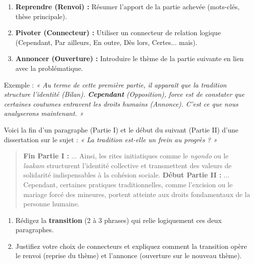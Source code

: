 \documentclass[11pt]{article}
\newcommand{\cle}[1]{{\popxbold\color{popdark}#1}}
\newcounter{popsec}
\newcounter{popsub}
\newcommand{\courssub}[1]{%
  \stepcounter{popsub}%
  \par\vspace{9pt}\noindent{\popxbold\fontsize{11.5}{13}\selectfont\color{popink}{\color{poporange}\thepopsec.\thepopsub}\hspace{6pt}#1}\par\nopagebreak\vspace{4pt}
}
\begin{document}
\begin{methode}
\begin{enumerate}
\item \textbf{Reprendre (Renvoi) :} Résumer l'apport de la partie achevée (mots-clés, thèse principale).
\item \textbf{Pivoter (Connecteur) :} Utiliser un connecteur de relation logique (Cependant, Par ailleurs, En outre, Dès lors, Certes... mais).
\item \textbf{Annoncer (Ouverture) :} Introduire le thème de la partie suivante en lien avec la problématique.
\end{enumerate}
Exemple : \emph{« Au terme de cette première partie, il apparaît que la tradition structure l'identité (Bilan). \textbf{Cependant} (Opposition), force est de constater que certaines coutumes entravent les droits humains (Annonce). C'est ce que nous analyserons maintenant. »}
\end{methode}

\begin{exercice}
Voici la fin d'un paragraphe (Partie I) et le début du suivant (Partie II) d'une dissertation sur le sujet : \emph{« La tradition est-elle un frein au progrès ? »}
\begin{quote}
\textbf{Fin Partie I :} ... Ainsi, les rites initiatiques comme le \textit{ngondo} ou le \textit{laakam} structurent l'identité collective et transmettent des valeurs de solidarité indispensables à la cohésion sociale.
\textbf{Début Partie II :} ... Cependant, certaines pratiques traditionnelles, comme l'excision ou le mariage forcé des mineures, portent atteinte aux droits fondamentaux de la personne humaine.
\end{quote}
\begin{enumerate}
\item Rédigez la \textbf{transition} (2 à 3 phrases) qui relie logiquement ces deux paragraphes.
\item Justifiez votre choix de connecteurs et expliquez comment la transition opère le \cle{renvoi} (reprise du thème) et l'\cle{annonce} (ouverture sur le nouveau thème).
\end{enumerate}
\end{exercice}

\courssub{Rédiger la conclusion}
\end{document}
